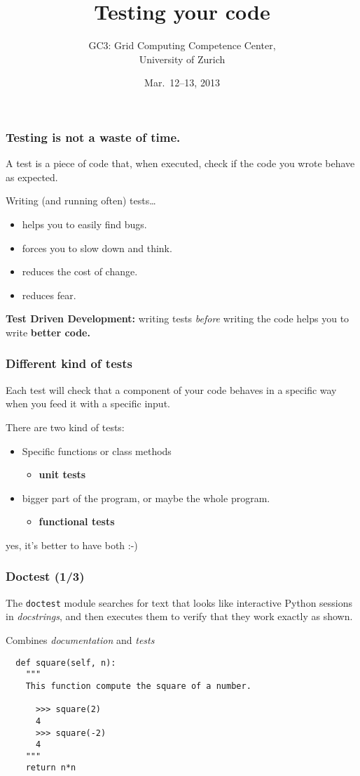 \documentclass[english,serif,mathserif,xcolor=pdftex,dvipsnames,table]{beamer}
\title[Testing]{%
  Testing your code
}
\author[GC3]{%
  GC3: Grid Computing Competence Center, \\
  University of Zurich
}
\date{Mar.~12--13, 2013}
\begin{document}
\maketitle


\begin{frame}
  \frametitle{Testing is \textbf{not} a waste of time.}
  A test is a piece of code that, when executed, check if the code you
  wrote behave as expected.

  \+
  Writing (and running often) tests\ldots
  \begin{itemize}
  \item helps you to easily find bugs.
  \item forces you to slow down and think.
  \item reduces the cost of change.
  \item reduces fear.
  \end{itemize}

  \+ \textbf{Test Driven Development:} writing tests \textit{before}
  writing the code helps you to write \textbf{better code.}
\end{frame}


\begin{frame}
  \frametitle{Different kind of tests}

  Each test will check that a component of your code behaves in a
  specific way when you feed it with a specific input.

  \+
  There are two kind of tests:
  \begin{itemize}
  \item Specific functions or class methods
    \begin{itemize}
    \item \textbf{unit tests}
    \end{itemize}
  \item bigger part of the program, or maybe the whole program.
    \begin{itemize}
    \item \textbf{functional tests}
    \end{itemize}
  \end{itemize}

  \+
  \pause
  yes, it's better to have both :-)
\end{frame}


\begin{frame}[fragile]
  \frametitle{Doctest (1/3)}

  The \lstinline|doctest| module searches for text that looks like
  interactive Python sessions in \textit{docstrings}, and then
  executes them to verify that they work exactly as shown.

  \+
  Combines \textit{documentation} and \textit{tests}
  \begin{lstlisting}
  def square(self, n):
    """
    This function compute the square of a number.

      >>> square(2)
      4
      >>> square(-2)
      4
    """
    return n*n
  \end{lstlisting}
\end{frame}
\end{document}
